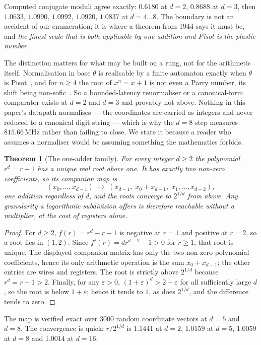 \documentclass[11pt]{article}
\newtheorem{theorem}{Theorem}
\theoremstyle{definition}
\begin{document}
Computed conjugate moduli agree exactly: $0.6180$ at $d=2$, $0.8688$ at $d=3$,
then $1.0633$, $1.0990$, $1.0992$, $1.0920$, $1.0837$ at $d=4\ldots8$. The
boundary is not an accident of our enumeration; it is where a theorem from 1944
says it must be, and \emph{the finest scale that is both applicable by one
addition and Pisot is the plastic number.}

The distinction matters for what may be built on a rung, not for the arithmetic
itself. Normalisation in base $\theta$ is realisable by a finite automaton
exactly when $\theta$ is Pisot~\cite{berend1994}, and for $n\ge4$ the root of
$x^n = x+1$ is not even a Parry number, its shift being
non-sofic~\cite{akiyama2016}. So a bounded-latency renormaliser or a
canonical-form comparator exists at $d=2$ and $d=3$ and provably not above.
Nothing in this paper's datapath normalises --- the coordinates are carried as
integers and never reduced to a canonical digit string --- which is why the
$d=8$ step measures $815.66$\,MHz rather than failing to close. We state it
because a reader who assumes a normaliser would be assuming something the
mathematics forbids.

\begin{theorem}[The one-adder family]\label{thm:oneadder}
For every integer $d\geq2$ the polynomial $r^{d}=r+1$ has a unique real root above one. It
has exactly two non-zero coefficients, so its companion map is
\[
  (x_0,\dots,x_{d-1}) \;\mapsto\; (x_{d-1},\; x_0+x_{d-1},\; x_1,\dots,x_{d-2}),
\]
\emph{one addition} regardless of $d$, and the roots converge to $2^{1/d}$ from
above. Any granularity a logarithmic subdivision offers is therefore reachable
without a multiplier, at the cost of registers alone.
\end{theorem}
\begin{proof}
For $d\geq2$, $f(r)=r^d-r-1$ is negative at $r=1$ and positive at $r=2$,
so a root lies in $(1,2)$. Since $f'(r)=dr^{d-1}-1>0$ for $r\geq1$,
that root is unique. The displayed companion matrix has only the two
non-zero polynomial coefficients, hence its only arithmetic operation is the
sum $x_0+x_{d-1}$; the other entries are wires and registers. The root is
strictly above $2^{1/d}$ because $r^d=r+1>2$. Finally, for any
$\varepsilon>0$, $(1+\varepsilon)^d>2+\varepsilon$ for all sufficiently
large $d$, so the root is below $1+\varepsilon$; hence it tends to $1$,
as does $2^{1/d}$, and the difference tends to zero.
\end{proof}

The map is verified exact over $3000$ random coordinate vectors at $d=5$ and
$d=8$. The convergence is quick: $r/2^{1/d}$ is $1.1441$ at $d=2$, $1.0159$ at
$d=5$, $1.0059$ at $d=8$ and $1.0014$ at $d=16$.
\end{document}
